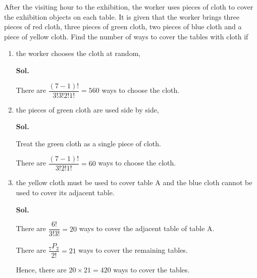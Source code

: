 \documentclass{report}
\newcommand\permtwo[2][^n]{{}_{#1}P_{#2}}
\newcommand{\sol}[1]{

      \noindent \textbf{Sol.}
}
\def\eos{\quad\hbox{\rlap{\hbox{\vrule depth 1.5pt height 2.6mm width 0.2mm \hskip 1mm \vrule height 2.6mm width 0.2mm}}{\vbox{\hrule height 0.2mm width 1.4mm \vskip 2.8mm \hrule depth 1.5pt height -0.35mm width 1.2mm}}}}
\begin{document}
\begin{multicols*}{2}
\begin{enumerate}
                  After the visiting hour to the exhibition, the worker uses pieces of cloth to
                  cover the exhibition objects on each table. It is given that the worker brings
                  three pieces of red cloth, three pieces of green cloth, two pieces of blue
                  cloth and a piece of yellow cloth. Find the number of ways to cover the tables
                  with cloth if
                  \begin{enumerate}
                        \item the worker chooses the cloth at random, \sol{}

                              There are $\dfrac{(7 - 1)!}{3!3!2!1!} = 560$ ways to choose the cloth. $\eos$

                        \item the pieces of green cloth are used side by side, \sol{}

                              Treat the green cloth as a single piece of cloth.

                              There are $\dfrac{(7 - 1)!}{3!2!1!} = 60$ ways to choose the cloth. $\eos$

                        \item the yellow cloth must be used to cover table A and the blue cloth cannot be
                              used to cover its adjacent table. \sol{}

                              There are $\dfrac{6!}{3!3!} = 20$ ways to cover the adjacent table of table A.

                              There are $\dfrac{\permtwo[7]{2}}{2!} = 21$ ways to cover the remaining tables.

                              Hence, there are $20 \times 21 = 420$ ways to cover the tables. $\eos$
                  \end{enumerate}
      \end{enumerate}
\end{multicols*}
\end{document}
